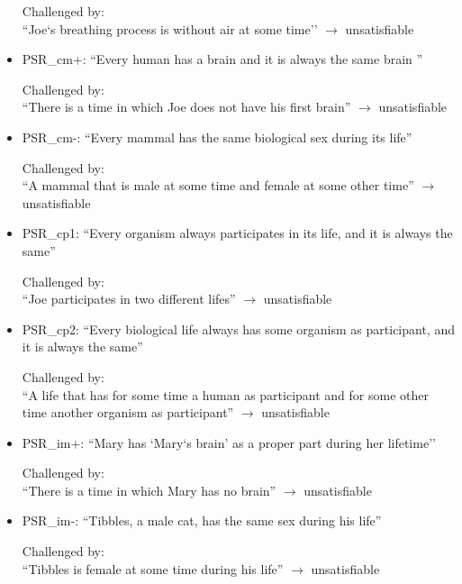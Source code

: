 \begin{itemize}
Challenged by: \\``Joe`s breathing process is without air at some time''  $\rightarrow$ unsatisfiable


\item PSR\_cm+: ``Every human has a brain and it is always the same brain ''

Challenged by: \\``There is a time in which Joe does not have his first brain''  $\rightarrow$ unsatisfiable



\item PSR\_cm-: ``Every mammal has the same biological sex during its life''

Challenged by: \\``A mammal that is male at some time and female at some other time''  $\rightarrow$ unsatisfiable

 
\item PSR\_cp1: ``Every organism always participates in its life, and it is always the same''

Challenged by: \\``Joe participates in two different lifes''  $\rightarrow$ unsatisfiable


\item PSR\_cp2: ``Every biological life always has some organism as participant, and it is always the same''

Challenged by: \\``A life that has for some time a human as participant and for some other time another organism as participant''  $\rightarrow$ unsatisfiable


\item PSR\_im+: ``Mary has `Mary`s brain' as a proper part during her lifetime''

Challenged by: \\``There is a time in which Mary has no brain''  $\rightarrow$ unsatisfiable


\item PSR\_im-: ``Tibbles, a male cat, has the same sex during his life'' 

Challenged by: \\``Tibbles is female at some time during his life''  $\rightarrow$ unsatisfiable



\end{itemize}
